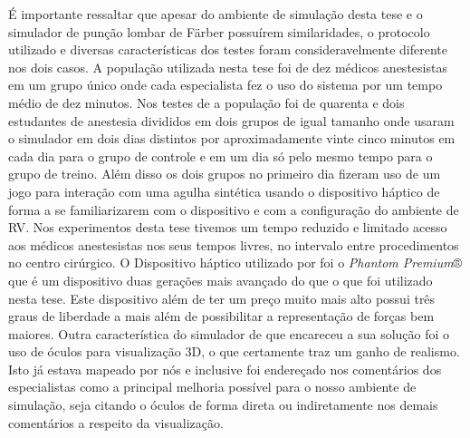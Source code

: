 É importante ressaltar que apesar do ambiente de simulação desta tese e o simulador de punção lombar de Färber \cite{Farber2009} possuírem similaridades, o protocolo utilizado e diversas características dos testes foram consideravelmente diferente nos dois casos. A população utilizada nesta tese foi de dez médicos anestesistas em um grupo único onde cada especialista fez o uso do sistema por um tempo médio de dez minutos. Nos testes de \textcite{Farber2009} a população foi de quarenta e dois estudantes de anestesia divididos em dois grupos de igual tamanho onde usaram o simulador em dois dias distintos por aproximadamente vinte cinco minutos em cada dia para o grupo de controle e em um dia só pelo mesmo tempo para o grupo de treino. Além disso os dois grupos no primeiro dia fizeram uso de um jogo para interação com uma agulha sintética usando o dispositivo háptico de forma a se familiarizarem com o dispositivo e com a configuração do ambiente de \acrshort{RV}. Nos experimentos desta tese tivemos um tempo reduzido e limitado acesso aos médicos anestesistas nos seus tempos livres, no intervalo entre procedimentos no centro cirúrgico.
O Dispositivo háptico utilizado por \textcite{Farber2009} foi o \textit{Phantom Premium}® que é um dispositivo duas gerações mais avançado do que o que foi utilizado nesta tese. Este dispositivo além de ter um preço muito mais alto possui três graus de liberdade a mais além de possibilitar a representação de forças bem maiores. Outra característica do simulador de \textcite{Farber2009} que encareceu a sua solução foi o uso de óculos para visualização 3D, o que certamente traz um ganho de realismo. Isto já estava mapeado por nós e inclusive foi endereçado nos comentários dos especialistas como a principal melhoria possível para o nosso ambiente de simulação, seja citando o óculos de forma direta ou indiretamente nos demais comentários a respeito da visualização. 


